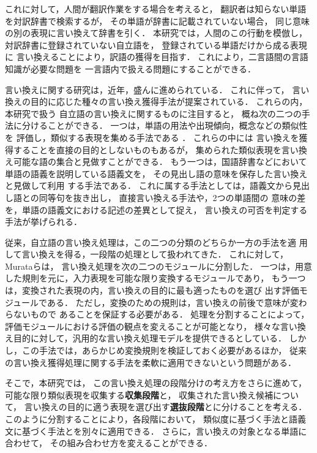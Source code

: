 これに対して，人間が翻訳作業をする場合を考えると，
翻訳者は知らない単語を対訳辞書で検索するが，
その単語が辞書に記載されていない場合，
同じ意味の別の表現に言い換えて辞書を引く．
本研究では，人間のこの行動を模倣し，
対訳辞書に登録されていない自立語を，
登録されている単語だけから成る表現に
言い換えることにより，訳語の獲得を目指す．
これにより，二言語間の言語知識が必要な問題を
一言語内で扱える問題にすることができる．

言い換えに関する研究は，近年，盛んに進められている\cite{yama01}．
これに伴って，
言い換えの目的に応じた種々の言い換え獲得手法が提案されている．
これらの内，本研究で扱う
自立語の言い換えに関するものに注目すると，
概ね次の二つの手法に分けることができる．
一つは，単語の用法や出現傾向，概念などの類似性を
評価し，類似する表現を集める手法である\cite{hindle}\cite{cui}
\cite{kasahara}．
これらの中には
言い換えを獲得することを直接の目的としないものもあるが，
集められた類似表現を言い換え可能な語の集合と見做すことができる．
もう一つは，国語辞書などにおいて単語の語義を説明している語義文を，
その見出し語の意味を保存した言い換えと見做して利用
する手法である．
これに属する手法としては，語義文から見出し語との同等句を抜き出し，
直接言い換える手法\cite{kajichi}\cite{ipsj02}や，2つの単語間の
意味の差を，単語の語義文における記述の差異として捉え，
言い換えの可否を判定する手法\cite{fuj00}\cite{fujita}が挙げられる．

従来，自立語の言い換え処理は，この二つの分類のどちらか一方の手法を適
用して言い換えを得る，一段階の処理として扱われてきた．
これに対して，Murataら\cite{murata}は，
言い換え処理を次の二つのモジュールに分割した．
一つは，用意した規則を元に，入力表現を可能な限り変換するモジュールであり，
もう一つは，変換された表現の内，言い換えの目的に最も適ったものを選び
出す評価モジュールである．
ただし，変換のための規則は，言い換えの前後で意味が変わらないもので
あることを保証する必要がある．
処理を分割することによって，
評価モジュールにおける評価の観点を変えることが可能となり，
様々な言い換え目的に対して，汎用的な言い換え処理モデルを提供できるとしている．
しかし，この手法では，あらかじめ変換規則を検証しておく必要があるほか，
従来の言い換え獲得処理に関する手法を柔軟に適用できないという問題がある．

そこで，本研究では，
この言い換え処理の段階分けの考え方をさらに進めて，
可能な限り類似表現を収集する{\bf 収集段階}と，
収集された言い換え候補について，
言い換えの目的に適う表現を選び出す{\bf 選抜段階}とに分けることを考える．
このように分割することにより，各段階において，
類似度に基づく手法と語義文に基づく手法とを別々に適用できる．
さらに，言い換えの対象となる単語に合わせて，
その組み合わせ方を変えることができる．



